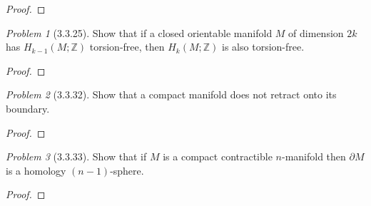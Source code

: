 \documentclass[10pt]{article}
\newcommand{\sk}{\vskip 10mm}
\newcommand{\bb}[1]{\mathbb{#1}}
\theoremstyle{remark}
\newtheorem{problem}{Problem}
\begin{document}
\begin{proof}
  
\end{proof}

\sk

\begin{problem}[3.3.25]
  Show that if a closed orientable manifold $M$ of dimension $2k$ has $H_{k-1}(M;\bb{Z})$ torsion-free, then $H_k(M;\bb{Z})$ is also torsion-free.
\end{problem}

\begin{proof}
  
\end{proof}

\sk

\begin{problem}[3.3.32]
  Show that a compact manifold does not retract onto its boundary.
\end{problem}

\begin{proof}
  
\end{proof}

\sk

\begin{problem}[3.3.33]
  Show that if $M$ is a compact contractible $n$-manifold then $\partial M$ is a homology $(n-1)$-sphere.
\end{problem}

\begin{proof}
  
\end{proof}

\sk
\end{document}
